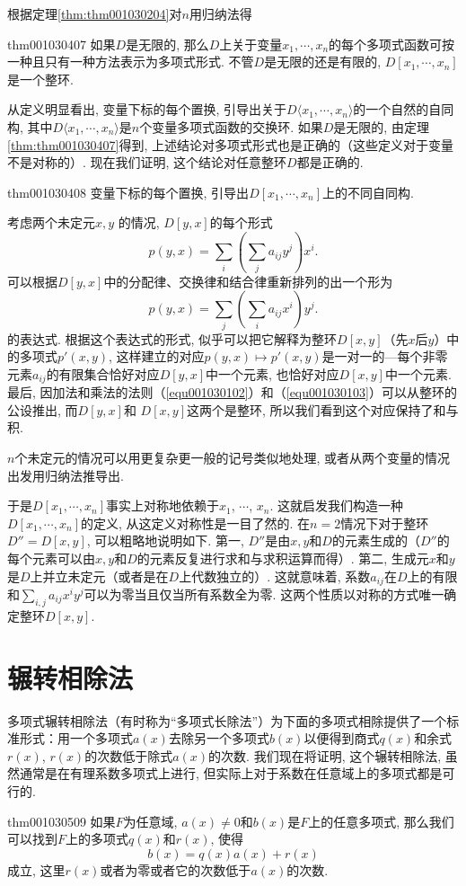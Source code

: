 根据定理\ref{thm:thm001030204}对$n$用归纳法得
\begin{theorem}{}{thm001030407}
如果$D$是无限的, 那么$D$上关于变量$x_1,\cdots, x_n$的每个多项式函数可按一种且只有一种方法表示为多项式形式. 不管$D$是无限的还是有限的, $D[x_1,\cdots,x_n]$是一个整环. 
\end{theorem}

从定义明显看出, 变量下标的每个置换, 引导出关于$D\langle{x_1,\cdots,x_n}\rangle$的一个自然的自同构, 其中$D\langle{x_1,\cdots, x_n}\rangle$是$n$个变量多项式函数的交换环. 如果$D$是无限的, 由定理\ref{thm:thm001030407}得到, 上述结论对多项式形式也是正确的（这些定义对于变量不是对称的）. 现在我们证明, 这个结论对任意整环$D$都是正确的. 
\begin{theorem}{}{thm001030408}
变量下标的每个置换, 引导出$D[x_1,\cdots,x_n]$上的不同自同构. 
\end{theorem}

考虑两个未定元$x, y$
的情况, $D[y, x]$的每个形式
\[
p(y, x) = \sum_{i}{(\sum_{j}{a_{ij}y^j})x^i}.
\]
可以根据$D[y,x]$中的分配律、交换律和结合律重新排列的出一个形为
\[
p(y, x) = \sum_{j}{(\sum_{i}{a_{ij}x^i})y^j}.
\]
的表达式. 根据这个表达式的形式, 似乎可以把它解释为整环$D[x, y]$（先$x$后$y$）中的多项式$p'(x, y)$, 这样建立的对应$p(y, x) \mapsto p'(x, y)$是一对一的---每个非零元素$a_{ij}$的有限集合恰好对应$D[y, x]$中一个元素, 也恰好对应$D[x, y]$中一个元素. 最后, 因加法和乘法的法则（\ref{equ001030102}）和（\ref{equ001030103}）可以从整环的公设推出, 而$D[y, x]$和 $D[x, y]$这两个是整环, 所以我们看到这个对应保持了和与积. 

$n$个未定元的情况可以用更复杂更一般的记号类似地处理, 或者从两个变量的情况出发用归纳法推导出. 

于是$D[x_1, \cdots, x_n]$事实上对称地依赖于$x_1$, $\cdots$, $x_n$. 这就启发我们构造一种$D[x_1, \cdots, x_n]$的定义, 从这定义对称性是一目了然的. 在$n=2$情况下对于整环$D''=D[x,y]$, 可以粗略地说明如下. 第一, $D''$是由$x, y$和$D$的元素生成的（$D''$的每个元素可以由$x, y$和$D$的元素反复进行求和与求积运算而得）. 第二, 生成元$x$和$y$是$D$上并立未定元（或者是在$D$上代数独立的）. 这就意味着, 系数$a_{ij}$在$D$上的有限和$\sum_{i,j}{a_{ij}x^iy^j}$可以为零当且仅当所有系数全为零. 这两个性质以对称的方式唯一确定整环$D[x, y]$. 


\section{辗转相除法}\label{subsection0010305}
多项式辗转相除法（有时称为“多项式长除法”）为下面的多项式相除提供了一个标准形式：用一个多项式$a(x)$去除另一个多项式$b(x)$以便得到商式$q(x)$和余式$r(x)$, $r(x)$的次数低于除式$a(x)$的次数. 我们现在将证明, 这个辗转相除法, 虽然通常是在有理系数多项式上进行, 但实际上对于系数在任意域上的多项式都是可行的. 
\begin{theorem}{}{thm001030509}
如果$F$为任意域, $a(x) \neq 0$和$b(x)$是$F$上的任意多项式, 那么我们可以找到$F$上的多项式$q(x)$和$r(x)$, 使得
\begin{equation}\label{equ001030508}
b(x)=q(x)a(x)+r(x)
\end{equation}
成立, 这里$r(x)$或者为零或者它的次数低于$a(x)$的次数. 
\end{theorem}

